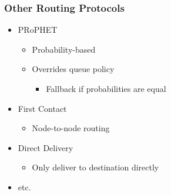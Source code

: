 \begin{frame}
  \frametitle{Other Routing Protocols}
  \begin{itemize}
	\item PRoPHET
    \begin{itemize}
      	\item Probability-based
      	\item Overrides queue policy
        \begin{itemize}
          	\item Fallback if probabilities are equal
        \end{itemize}
    \end{itemize}
    \vspace{0.3cm}
    \item First Contact
	\begin{itemize}
      	\item Node-to-node routing
    \end{itemize}
    \vspace{0.3cm}
    \item Direct Delivery
	\begin{itemize}
      	\item Only deliver to destination directly
    \end{itemize}
    \vspace{0.3cm}
    \item etc.
    \vspace{0.3cm}
  \end{itemize}
\end{frame}


